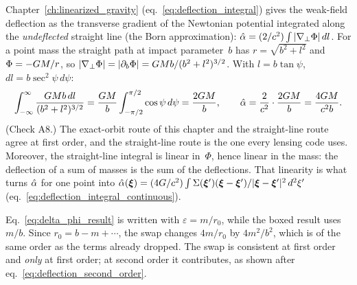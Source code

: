 \begin{derivation}
Chapter~\ref{ch:linearized_gravity} (eq.~\eqref{eq:deflection_integral}) gives the weak-field deflection as
the transverse gradient of the Newtonian potential integrated along the
\emph{undeflected} straight line (the Born approximation):
$\hat{\alpha} = (2/c^2)\int |\nabla_\perp\Phi|\,dl$.  For a point mass
the straight path at impact parameter~$b$ has $r = \sqrt{b^2 + l^2}$ and
$\Phi = -G M/r$, so
$|\nabla_\perp \Phi| = |\partial_b \Phi| = G M b/(b^2+l^2)^{3/2}$.  With
$l = b\tan\psi$, $dl = b\sec^2\psi\,d\psi$:
\[
    \int_{-\infty}^{\infty}\frac{G M b\,dl}{(b^2+l^2)^{3/2}}
    = \frac{G M}{b}\int_{-\pi/2}^{\pi/2}\cos\psi\,d\psi
    = \frac{2G M}{b},
    \qquad
    \hat{\alpha} = \frac{2}{c^2}\cdot\frac{2G M}{b}
    = \frac{4G M}{c^2 b}.
\]
(Check A8.)  The exact-orbit route of this chapter and the straight-line
route agree at first order, and the straight-line route is the one every
lensing code uses.  Moreover, the straight-line integral is linear in~$\Phi$,
hence linear in the mass: the deflection of a sum of masses is the sum of the
deflections.  That linearity is what turns $\hat{\alpha}$ for one point into
$\hat{\alpha}(\boldsymbol{\xi}) = (4G/c^2)\int \Sigma(\boldsymbol{\xi}')
(\boldsymbol{\xi}-\boldsymbol{\xi}')/|\boldsymbol{\xi}-\boldsymbol{\xi}'|^2\,d^2\xi'$
(eq.~\eqref{eq:deflection_integral_continuous}).
\end{derivation}

\begin{annotation}
Eq.~\eqref{eq:delta_phi_result} is written with $\varepsilon = m/r_0$, while the
boxed result uses $m/b$.  Since $r_0 = b - m + \cdots$, the swap changes
$4m/r_0$ by $4m^2/b^2$, which is of the same order as the terms already
dropped.  The swap is consistent at first order and \emph{only} at first order;
at second order it contributes, as shown after
eq.~\eqref{eq:deflection_second_order}.
\end{annotation}

